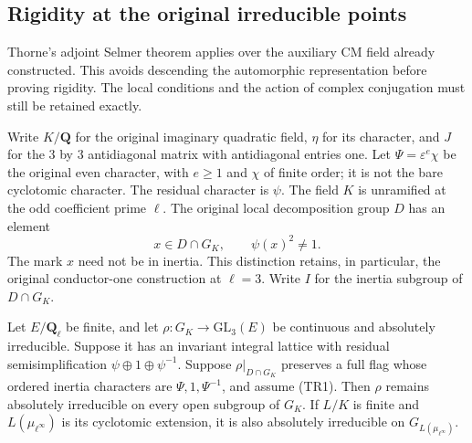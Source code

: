 \subsection{Rigidity at the original irreducible points}
\label{sec:support-type-one-rigidity}

Thorne's adjoint Selmer theorem applies over the auxiliary CM field
already constructed.  This avoids descending the automorphic
representation before proving rigidity.  The local conditions and the
action of complex conjugation must still be retained exactly.

Write $K/\mathbf Q$ for the original imaginary quadratic field, $\eta$
for its character, and $J$ for the $3$ by $3$ antidiagonal matrix with
antidiagonal entries one.  Let $\Psi=\varepsilon^e\chi$ be the original
even character, with $e\ge1$ and $\chi$ of finite order; it is not the
bare cyclotomic character.  The residual character is $\psi$.
The field $K$ is unramified at the odd coefficient prime $\ell$.
The original local decomposition group $D$ has an element
\[
       x\in D\cap G_K,\qquad \psi(x)^2\ne1.             \tag{TR1}
\]
The mark $x$ need not be in inertia.  This distinction retains, in
particular, the original conductor-one construction at $\ell=3$.
Write $I$ for the inertia subgroup of $D\cap G_K$.

\begin{lemma}
\label{lem:support-type-one-strong-irreducibility}
Let $E/\mathbf Q_\ell$ be finite, and let
$\rho:G_K\to\mathrm{GL}_3(E)$ be continuous and absolutely irreducible.
Suppose it has an invariant integral lattice with residual
semisimplification $\psi\oplus1\oplus\psi^{-1}$.  Suppose
$\rho|_{D\cap G_K}$ preserves a full flag whose ordered inertia
characters are $\Psi,1,\Psi^{-1}$, and assume (TR1).
Then $\rho$ remains absolutely irreducible on every open subgroup of
$G_K$.  If $L/K$ is finite and $L(\mu_{\ell^\infty})$ is its
cyclotomic extension, it is also absolutely irreducible on
$G_{L(\mu_{\ell^\infty})}$.
\end{lemma}

